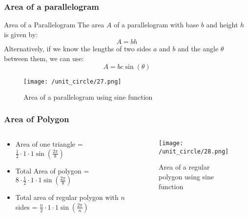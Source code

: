     \begin{frame}
        \frametitle{Area of a parallelogram}
        \begin{block}{Area of a Parallelogram}
            The area \(A\) of a parallelogram with base \(b\) and height \(h\) is given by:
            \[
            A = b h
            \]
            Alternatively, if we know the lengths of two sides \(a\) and \(b\) and the angle \(\theta\) between them, we can use:
            \[
            A =  bc \sin(\theta)
            \]
        \end{block}
        \begin{figure}
            \centering
            \texttt{[image: /unit\_circle/27.png]}
            \caption{Area of a parallelogram using sine function}
        \end{figure}
    \end{frame}

    \begin{frame}
        \frametitle{Area of Polygon}
        \begin{columns}
            \begin{column}{0.5\textwidth}
                \begin{itemize}
                    \item Area of one triangle = \(\frac{1}{2} \cdot 1 \cdot 1 \sin(\frac{2\pi}{8})\)
                    \item Total Area of polygon = \(8 \cdot \frac{1}{2} \cdot 1 \cdot 1 \sin(\frac{2\pi}{8})\)
                    \item Total area of regular polygon with \(n\) sides = \(\frac{n}{2} \cdot 1 \cdot 1 \sin(\frac{2\pi}{n})\)
                \end{itemize}
            \end{column}
            \begin{column}{0.5\textwidth}
                \begin{figure}
                    \centering
                    \texttt{[image: /unit\_circle/28.png]}
                    \caption{Area of a regular polygon using sine function}
                \end{figure}
            \end{column}
        \end{columns}
    \end{frame}
    
